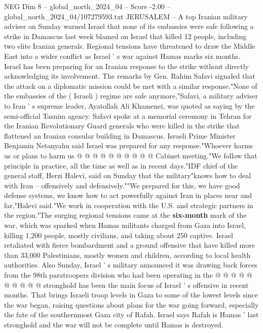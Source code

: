 \begin{textsample}{NEG Dim 8 – global\_north\_2024\_04 – Score -2.00 – global\_north\_2024\_04/107279593.txt}  \label{ex:f8_neg_128}
JERUSALEM -- A top Iranian military adviser on Sunday warned Israel that none of its embassies were safe following a strike in Damascus last week blamed on Israel that killed 12 people, including two elite Iranian generals.
Regional tensions have threatened to draw the Middle East into a wider conflict as Israel ' s war against Hamas marks six months.
Israel has been preparing for an Iranian response to the strike without directly acknowledging its involvement.
The remarks by Gen.
Rahim Safavi signaled that the attack on a diplomatic mission could be met with a similar response."None of the embassies of the ( Israeli ) regime are safe anymore,"Safavi, a military adviser to Iran ' s supreme leader, Ayatollah Ali Khamenei, was quoted as saying by the semi-official Tasnim agency.
Safavi spoke at a memorial ceremony in Tehran for the Iranian Revolutionary Guard generals who were killed in the strike that flattened an Iranian consular building in Damascus.
Israeli Prime Minister Benjamin Netanyahu said Israel was prepared for any response."Whoever harms us or plans to harm us @ @ @ @ @ @ @ @ @ @ Cabinet meeting."We follow that principle in practice, all the time as well as in recent days."IDF chief of the general staff, Herzi Halevi, said on Sunday that the military"knows how to deal with Iran -- offensively and defensively.""We prepared for this, we have good defense systems, we know how to act powerfully against Iran in places near and far,"Halevi said."We work in cooperation with the U.S. and strategic partners in the region."The surging regional tensions came at the \textbf{six-month} mark of the war, which was sparked when Hamas militants charged from Gaza into Israel, killing 1,200 people, mostly civilians, and taking about 250 captive.
Israel retaliated with fierce bombardment and a ground offensive that have killed more than 33,000 Palestinians, mostly women and children, according to local health authorities.
Also Sunday, Israel ' s military announced it was drawing back forces from the 98th paratroopers division who had been operating in the @ @ @ @ @ @ @ @ @ @ stronghold has been the main focus of Israel ' s offensive in recent months.
That brings Israeli troop levels in Gaza to some of the lowest levels since the war began, raising questions about plans for the war going forward, especially the fate of the southernmost Gaza city of Rafah.
Israel says Rafah is Hamas ' last stronghold and the war will not be complete until Hamas is destroyed.

\end{textsample}

